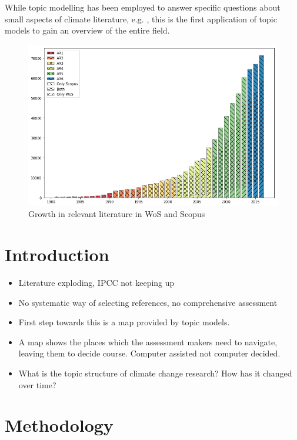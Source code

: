 \documentclass{article}
\begin{document}
While topic modelling has been employed to answer specific questions about small aspects of climate literature, e.g. \citep[e.g.][]{minx2016negative,Grubert2016}, this is the first application of topic models to gain an overview of the entire field.



\begin{figure}
	\includegraphics[width=\linewidth]{plots/wos_scopus_docs_time}
    \caption{Growth in relevant literature in WoS and Scopus}
    \label{growth}
\end{figure}




\section{Introduction}
\begin{itemize}
	\item Literature exploding, IPCC not keeping up \citep{minx2016learning}
    \item No systematic way of selecting references, no comprehensive assessment
    \item First step towards this is a map provided by topic models. 
    \item A map shows the places which the assessment makers need to navigate, leaving them to decide course. Computer assisted not computer decided.
    \item What is the topic structure of climate change research? How has it changed over time?
\end{itemize}

\section{Methodology}
\end{document}
